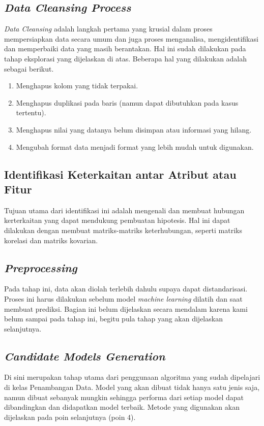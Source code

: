 \documentclass{article}
\begin{document}
\begin{normalsize}
        \subsection{\textit{Data Cleansing Process}}
        \textit{Data Cleansing} adalah langkah pertama yang krusial dalam proses mempersiapkan data secara 
        umum dan juga proses menganalisa, mengidentifikasi dan memperbaiki data yang masih berantakan. Hal ini
        sudah dilakukan pada tahap eksplorasi yang dijelaskan di atas. Beberapa hal yang dilakukan adalah
        sebagai berikut.
        \begin{enumerate}[label=\alph*.]
            \item Menghapus kolom yang tidak terpakai.
            \item Menghapus duplikasi pada baris (namun dapat dibutuhkan pada kasus tertentu).
            \item Menghapus nilai yang datanya belum disimpan atau informasi yang hilang.
            \item Mengubah format data menjadi format yang lebih mudah untuk digunakan.
        \end{enumerate}

        \subsection{Identifikasi Keterkaitan antar Atribut atau Fitur}
        Tujuan utama dari identifikasi ini adalah mengenali dan membuat hubungan kerterkaitan yang dapat
        mendukung pembuatan hipotesis. Hal ini dapat dilakukan dengan membuat matriks-matriks keterhubungan,
        seperti matriks korelasi dan matriks kovarian.

        \subsection{\textit{Preprocessing}}
        Pada tahap ini, data akan diolah terlebih dahulu supaya dapat distandarisasi. Proses ini harus dilakukan
        sebelum model \textit{machine learning} dilatih dan saat membuat prediksi. Bagian ini belum dijelaskan
        secara mendalam karena kami belum sampai pada tahap ini, begitu pula tahap yang akan dijelaskan selanjutnya.

        \subsection{\textit{Candidate Models Generation}}
        Di sini merupakan tahap utama dari penggunaan algoritma yang sudah dipelajari di kelas Penambangan Data.
        Model yang akan dibuat tidak hanya satu jenis saja, namun dibuat sebanyak mungkin sehingga performa dari
        setiap model dapat dibandingkan dan didapatkan model terbaik. Metode yang digunakan akan dijelaskan pada
        poin selanjutnya (poin 4).


\end{normalsize}
\end{document}
